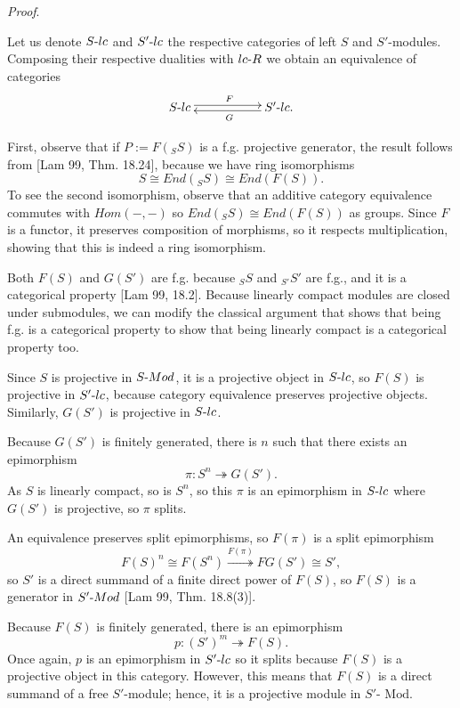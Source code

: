 \documentclass[11pt]{article}
\theoremstyle{plain}
\theoremstyle{remark}
\theoremstyle{plain}
\newenvironment{Proof}{
  \par\medskip\noindent
  \textit{Proof}.
}{
\newline
\rightline{$\qedsymbol$}
}
\begin{document}
\begin{Proof}
    Let us denote $S\text-lc$ and $S'\text-lc$ the respective categories of left $S$ and $S'$-modules. Composing their respective dualities with $lc\text-R$ we obtain an equivalence of categories \[
\xymatrix{
   S\text-lc \ar@<0.5ex>[rr]^{F} 
    & & S'\text-lc. \ar@<0.5ex>[ll]^{G}
}\]
    
    First, observe that if $P:=F(_SS)$ is a f.g. projective generator, the result follows from [Lam 99, Thm. 18.24], because we have ring isomorphisms 
    \[S\cong End(_SS)\cong End(F(S)).\]
    To see the second isomorphism, observe that an additive category equivalence commutes with $Hom(-, -)$ so $End(_SS)\cong End(F(S))$ as groups. Since $F$ is a functor, it preserves composition of morphisms, so it respects multiplication, showing that this is indeed a ring isomorphism. 
    

    Both $F(S)$ and $G(S')$ are f.g. because $_SS$ and $_{S'}S'$ are f.g., and it is a categorical property [Lam 99, 18.2]. Because linearly compact modules are closed under submodules, we can modify the classical argument that shows that being f.g. is a categorical property to show that being linearly compact is a categorical property too.
    
    Since $S$ is projective in $S\text-Mod$, it is a projective object in $S\text-lc$, so $F(S)$ is projective in $S'\text-lc$, because category equivalence preserves projective objects. Similarly, $G(S')$ is projective in $S\text-lc$.
    
    Because $G(S')$ is finitely generated, there is $n$ such that there exists an epimorphism \[\pi\colon S^n\twoheadrightarrow G(S').\] As $S$ is linearly compact, so is $S^n$, so this $\pi$ is an epimorphism in $S\text-lc$ where $G(S')$ is projective, so $\pi$ splits. 

    An equivalence preserves split epimorphisms, so  $F(\pi)$ is a split epimorphism 
    \[F(S)^n\cong F(S^n) \overset{F(\pi)}{\twoheadrightarrow} FG(S')\cong S', \]
    so $S'$ is a direct summand of a finite direct power of $F(S)$, so $F(S)$ is a generator in $S'\text-Mod$ [Lam 99, Thm. 18.8(3)].

    Because $F(S)$ is finitely generated, there is an epimorphism \[p\colon (S')^m\twoheadrightarrow F(S).\] Once again, $p$ is an epimorphism in $S'\text-lc$ so it splits because $F(S)$ is a projective object in this category. However, this means that $F(S)$ is a direct summand of a free $S'$-module; hence, it is a projective module in $ S'\text {- Mod} $.    
\end{Proof}
\end{document}
